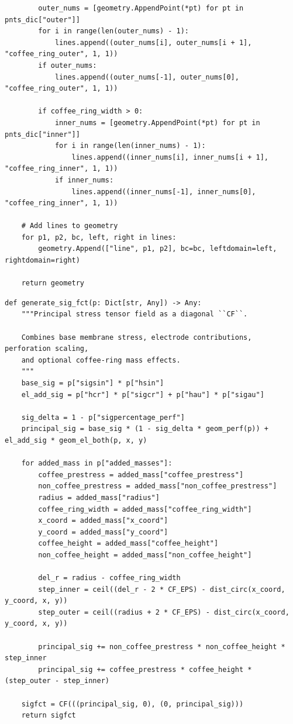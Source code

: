 \begin{verbatim}
        outer_nums = [geometry.AppendPoint(*pt) for pt in pnts_dic["outer"]]
        for i in range(len(outer_nums) - 1):
            lines.append((outer_nums[i], outer_nums[i + 1], "coffee_ring_outer", 1, 1))
        if outer_nums:
            lines.append((outer_nums[-1], outer_nums[0], "coffee_ring_outer", 1, 1))

        if coffee_ring_width > 0:
            inner_nums = [geometry.AppendPoint(*pt) for pt in pnts_dic["inner"]]
            for i in range(len(inner_nums) - 1):
                lines.append((inner_nums[i], inner_nums[i + 1], "coffee_ring_inner", 1, 1))
            if inner_nums:
                lines.append((inner_nums[-1], inner_nums[0], "coffee_ring_inner", 1, 1))

    # Add lines to geometry
    for p1, p2, bc, left, right in lines:
        geometry.Append(["line", p1, p2], bc=bc, leftdomain=left, rightdomain=right)

    return geometry

\end{verbatim}
\begin{verbatim}
def generate_sig_fct(p: Dict[str, Any]) -> Any:
    """Principal stress tensor field as a diagonal ``CF``.

    Combines base membrane stress, electrode contributions, perforation scaling,
    and optional coffee-ring mass effects.
    """
    base_sig = p["sigsin"] * p["hsin"]
    el_add_sig = p["hcr"] * p["sigcr"] + p["hau"] * p["sigau"]

    sig_delta = 1 - p["sigpercentage_perf"]
    principal_sig = base_sig * (1 - sig_delta * geom_perf(p)) + el_add_sig * geom_el_both(p, x, y)

    for added_mass in p["added_masses"]:
        coffee_prestress = added_mass["coffee_prestress"]
        non_coffee_prestress = added_mass["non_coffee_prestress"]
        radius = added_mass["radius"]
        coffee_ring_width = added_mass["coffee_ring_width"]
        x_coord = added_mass["x_coord"]
        y_coord = added_mass["y_coord"]
        coffee_height = added_mass["coffee_height"]
        non_coffee_height = added_mass["non_coffee_height"]

        del_r = radius - coffee_ring_width
        step_inner = ceil((del_r - 2 * CF_EPS) - dist_circ(x_coord, y_coord, x, y))
        step_outer = ceil((radius + 2 * CF_EPS) - dist_circ(x_coord, y_coord, x, y))

        principal_sig += non_coffee_prestress * non_coffee_height * step_inner
        principal_sig += coffee_prestress * coffee_height * (step_outer - step_inner)

    sigfct = CF(((principal_sig, 0), (0, principal_sig)))
    return sigfct

\end{verbatim}
